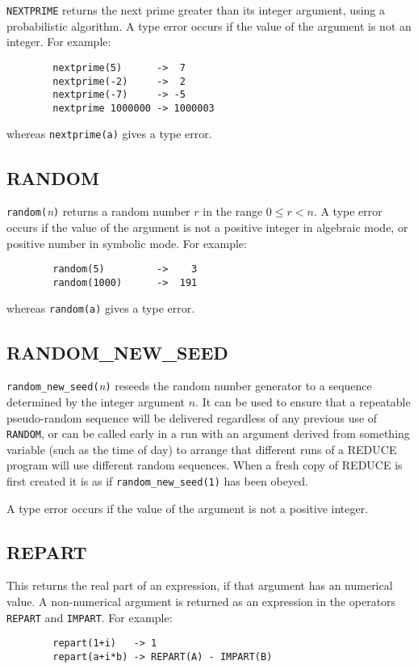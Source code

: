 \texttt{NEXTPRIME} returns the next prime greater than its integer argument,
using a probabilistic algorithm.  A type error occurs if the value of the
argument is not an integer.  For example:
\begin{verbatim}
        nextprime(5)      ->  7
        nextprime(-2)     ->  2
        nextprime(-7)     -> -5
        nextprime 1000000 -> 1000003
\end{verbatim}
whereas \texttt{nextprime(a)} gives a type error.

\subsection{RANDOM}
\hypertarget{operator:RANDOM}{}

\texttt{random(}{\em n\/}\texttt{)} returns a random number $r$ in the
range $0\leq r < n$.  A type error occurs if the value of the argument is not a
positive integer in algebraic mode, or positive number in symbolic mode.
For example:
\begin{verbatim}
        random(5)         ->    3
        random(1000)      ->  191
\end{verbatim}
whereas \texttt{random(a)} gives a type error.

\subsection{RANDOM\_NEW\_SEED}
\hypertarget{operator:RANDOM_NEW_SEED}{}

\texttt{random\_new\_seed(}\emph{n}\texttt{)} reseeds the random number
generator
to a sequence determined by the integer argument $n$.  It can be used to
ensure that a repeatable pseudo-random sequence will be delivered
regardless of any previous use of \texttt{RANDOM}, or can be called early in
a run with an argument derived from something variable (such as the time
of day) to arrange that different runs of a REDUCE program will use
different random sequences.  When a fresh copy of REDUCE is first created
it is as if \texttt{random\_new\_seed(1)} has been obeyed.

A type error occurs if the value of the argument is not a positive integer.

\subsection{REPART}
\hypertarget{operator:REPART}{}
This returns the real part of an expression, if that argument has an
numerical value.  A non-numerical argument is returned as an expression in
the operators \texttt{REPART} and \texttt{IMPART}.  
For example:
\begin{verbatim}
        repart(1+i)   -> 1
        repart(a+i*b) -> REPART(A) - IMPART(B)
\end{verbatim}

